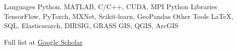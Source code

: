 \documentclass{tidycv} %
\begin{document}
\begin{cvtechnicalstrengths}
  \cvtechnicalstrength
  {Languages} %
  {Python, MATLAB, C/C++, CUDA, MPI} %
  \cvtechnicalstrength
  {Python Libraries} %
  {TensorFlow, PyTorch, MXNet, Scikit-learn, GeoPandas} %
   \cvtechnicalstrength
  {Other Tools} %
  {LaTeX, SQL, Elasticsearch, DIRSIG, GRASS GIS, QGIS, ArcGIS} %
\end{cvtechnicalstrengths}



Full list at \href{https://scholar.google.com/citations?hl=en&user=8XedxuAAAAAJ&view_op=list_works&sortby=pubdate}{Google Scholar}


\begin{cvpublications}
\begin{bibunit}[tidycv]
  \nocite{Langford:2019:RSC:3324921.3328781}
  \nocite{Langford_DMESS2019_20191108}
  \nocite{Langford_RemoteSens_20190102}
  \nocite{langford_20190158805}
   \nocite{Langford_RemoteSens_20160906}
  \putbib[zlangford]
\end{bibunit}
\end{cvpublications}
\end{document}
